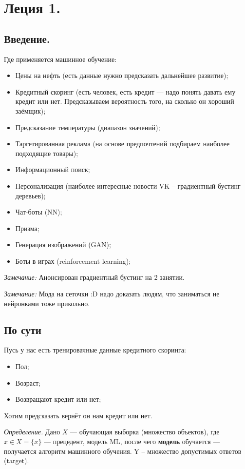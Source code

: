 \documentclass[a4paper,14pt]{article}
\begin{document}
\section{Леция 1.  }
\subsection {Введение.}
Где применяется машинное обучение:
\begin{itemize}
    \item Цены на нефть (есть данные нужно предсказать дальнейшее развитие);
    \item Кредитный скоринг (есть человек, есть кредит --- надо понять давать ему кредит или нет. Предсказываем вероятность того, на сколько он хороший заёмщик);
    \item Предсказание температуры (диапазон значений);
    \item Таргетированная реклама (на основе предпочтений подбираем наиболее подходящие товары);
    \item Информационный поиск;
    \item Персонализация (наиболее интересные новости VK -- градиентный бустинг деревьев);
    \item Чат-боты (NN);
    \item Призма;
    \item Генерация изображений (GAN); 
    \item Боты в играх (reinforcement learning);
\end{itemize}

{\it Замечание:} Анонсирован градиентный бустинг на 2 занятии.

{\it Замечание:} Мода на сеточки :D надо доказать людям, что заниматься не нейронками тоже прикольно.


\subsection{По сути}

Пусь у нас есть тренировачные данные кредитного скоринга:
\begin{itemize}
    \item Пол;
    \item Возраст;
    \item Возвращают кредит или нет;
\end{itemize} 

Хотим предсказать вернёт он нам кредит или нет.

{\it Определение.} Дано $X$ --- обучающая выборка (множество объектов), где $x \in X = \{x\}$ --- прецедент, модель ML, после чего {\bf модель} обучается --- получается алгоритм машинного обучения. Y -- множество допустимых ответов (target).
\end{document}
